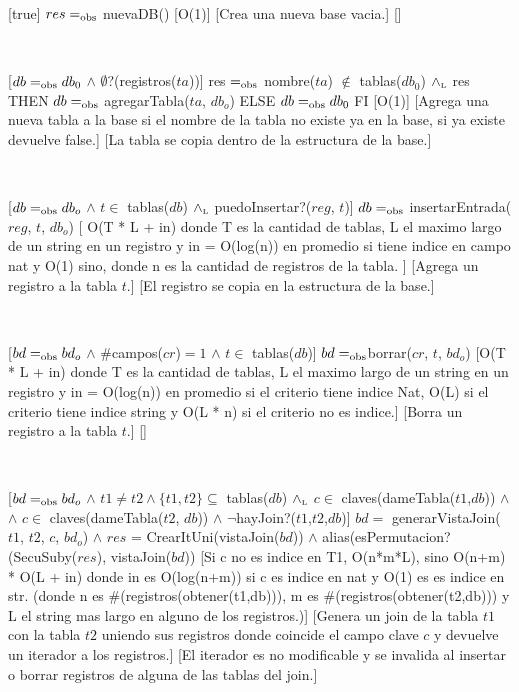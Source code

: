 \begin{Interfaz}

[true]
{$res =_{\mathrm{obs}}$ nuevaDB()}
[O(1)]
[Crea una nueva base vacia.]
[]

~

[$db =_{\mathrm{obs}} db_0$ $\land$ $\emptyset$?(registros($ta$))]
{res $=_{\mathrm{obs}}$ nombre($ta$) $\notin$ tablas($db_0$) $\land_{\mathrm{\scriptscriptstyle{L}}}$ \IF res THEN $db =_{\mathrm{obs}} $ agregarTabla($ta$, $db_o$) ELSE $db =_{\mathrm{obs}} db_0$  FI    }
[O(1)]
[Agrega una nueva tabla a la base si el nombre de la tabla no existe ya en la base, si ya existe devuelve false.]
[La tabla se copia dentro de la estructura de la base.]

~

[$db =_{\mathrm{obs}} db_o$ $\land$ $t \in$ tablas($db$) $\land_{\mathrm{\scriptscriptstyle{L}}}$ puedoInsertar?($reg$, $t$)]
{$db =_{\mathrm{obs}} $ insertarEntrada($reg$, $t$, $db_o$)}
[ O(T * L + in) donde T es la cantidad de tablas, L el maximo largo de un string en un registro y in = O(log(n)) en promedio si tiene indice en campo nat y O(1) sino, donde n es la cantidad de registros de la tabla. ]
[Agrega un registro a la tabla $t$.]
[El registro se copia en la estructura de la base.]

~

[$bd =_{\mathrm{obs}} bd_o$ $\land$ \#campos($cr$)$=1$ $\land$ $t \in$ tablas($db$)]
{$bd =_{\mathrm{obs}} $borrar($cr$, $t$, $bd_o$)}
[O(T * L + in)  donde T es la cantidad de tablas, L el maximo largo de un string en un registro y in = O(log(n)) en promedio si el criterio tiene indice Nat, O(L) si el criterio tiene indice string y O(L * n) si el criterio no es indice.]
[Borra un registro a la tabla $t$.]
[]

~

[$bd =_{\mathrm{obs}} bd_o$ $\land$ $t1 \neq t2 \land \{t1,t2\} \subseteq$ tablas($db$) $\land_{\mathrm{\scriptscriptstyle{L}}}$ $c \in$ claves(dameTabla($t1$,$db$)) $\land$ \\ $\land$ $c \in $ claves(dameTabla($t2$, $db$)) $\land$ $\neg$hayJoin?($t1$,$t2$,$db$)]
{$bd = $ generarVistaJoin($t1$, $t2$, $c$, $bd_o$) $\land$ $res$ = CrearItUni(vistaJoin($bd$)) $\land$ alias(esPermutacion?(SecuSuby($res$), vistaJoin($bd$))}
[Si c no es indice en T1, O(n*m*L), sino O(n+m) * O(L + in) donde in es O(log(n+m)) si c es indice en nat y O(1) es es indice en str. (donde n es \#(registros(obtener(t1,db))), m es \#(registros(obtener(t2,db))) y L el string mas largo en alguno de los registros.)]
[Genera un join de la tabla $t1$ con la tabla $t2$ uniendo sus registros donde coincide el campo clave $c$ y devuelve un iterador a los registros.]
[El iterador es no modificable y se invalida al insertar o borrar registros de alguna de las tablas del join.]


\end{Interfaz}

